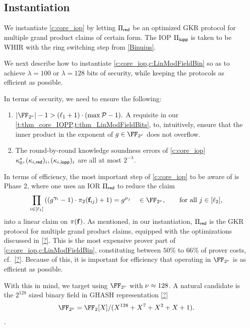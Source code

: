 \documentclass[11pt,letterpaper,usenames,dvipsnames]{article}
\begin{document}
\subsection{Instantiation}\label{s:instantiation}

We instantiate \cref{c:core_iop} by letting $\Pi_{\mathsf{red}}$ be an optimized GKR protocol for multiple grand product claims of certain form. The IOP $\Pi_{\mathsf{iopp}}$ is taken to be WHIR \cite{whir} with the ring switching step from \cref{Binuius}.


We next describe how to instantiate \cref{c:core_iop,c:LinModFieldBin} so as to achieve $\lambda=100$ or $\lambda=128$ bits of security, while keeping the protocols as efficient as possible.  


In terms of security, we need to ensure the following:
\begin{enumerate}
    \item $|\comfield|-1 >  (\codedim_1 + 1) \cdot (\max\cP-1).$  A requisite in our \cref{t:thm_core_IOPP,t:thm_LinModFieldBits}, to, intuitively, ensure that the inner product in the exponent of $g\in \comfield$ does not overflow. 
    \item The round-by-round knowledge soundness errors of \cref{c:core_iop} $\kappa_0^*, (\kappa_{i,\mathsf{red}})_i, (\kappa_{i,\mathsf{iopp}})_i$ are all at most $2^{-\lambda}$. 
\end{enumerate}
%


In terms of efficiency, the most important step of \cref{c:core_iop} to be aware of is Phase 2, where one uses an IOR $\Pi_{\mathsf{red}}$ to reduce the claim 
$$
\prod_{i \in [\codedim_1]} \left(\left(g^{\bm{\gamma}_i}-1\right)\cdot \pi_2(\bff_{ij}) +1\right)= g^{\mu_j}  \quad  \in \comfield, \qquad \text{for all } j\in [\codedim_2],
$$
into a linear claim on $\pi(\mathbf{f})$. As mentioned, in our instantiation, $\Pi_{\mathsf{red}}$ is the GKR protocol for multiple grand product claims,
%
equipped with the optimizations discussed in \cref{?}. This is the most expensive prover part of \cref{c:core_iop,c:LinModFieldBin}, constituting between $50\%$ to $66\%$ of prover costs, cf.\ \cref{?}. Because of this, it is important for efficiency that operating in $\comfield$ is as efficient as possible. 

With this in mind, we target using $\comfield$ with $\nu\approx 128$. A natural candidate is the $2^{128}$ sized binary field in GHASH representation \cref{?}  $$\comfield= \FF_2[X]/(X^{128} + X^7 + X^2 + X + 1).$$ .  
\end{document}

